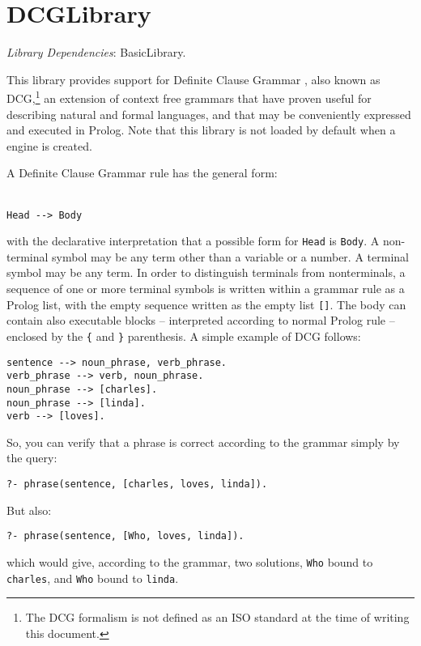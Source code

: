 \clearpage

\section{DCGLibrary}
\label{sec:dgc-library}

\noindent \emph{Library Dependencies}: BasicLibrary.

This library provides support for Definite Clause Grammar
\cite{bra00}, also known as DCG,\footnote{The DCG formalism is not
defined as an ISO standard at the time of writing this document.} an
extension of context free grammars that have proven useful for
describing natural and formal languages, and that may be
conveniently expressed and executed in Prolog.
%
Note that this library is not loaded by default when a \tuprolog{}
engine is created.

A Definite Clause Grammar rule has the general form:\\\\
%
\begin{verbatim}
Head --> Body
\end{verbatim}
%
with the declarative interpretation that a possible form for \texttt{Head}
is \texttt{Body}.
%
A non-terminal symbol may be any term other than a variable or a
number.
%
A terminal symbol may be any term. In order to distinguish
terminals from nonterminals, a sequence of one or more terminal
symbols  is written within a grammar rule as a Prolog list, with the
empty sequence written as the empty list \verb|[]|.
%
The body can contain also executable blocks -- interpreted
according to normal Prolog rule -- enclosed by the \verb|{| and
\verb|}| parenthesis.
%
A simple example of DCG follows:
%
\begin{verbatim}
sentence --> noun_phrase, verb_phrase.
verb_phrase --> verb, noun_phrase.
noun_phrase --> [charles].
noun_phrase --> [linda].
verb --> [loves].
\end{verbatim}
%
So, you can verify that a phrase is correct according to
the grammar simply by the query:
%
\begin{verbatim}
?- phrase(sentence, [charles, loves, linda]).
\end{verbatim}
%
But also:
%
\begin{verbatim}
?- phrase(sentence, [Who, loves, linda]).
\end{verbatim}
%
which would give, according to the grammar, two solutions,
\texttt{Who} bound to \texttt{charles}, and \texttt{Who} bound to
\texttt{linda}.

